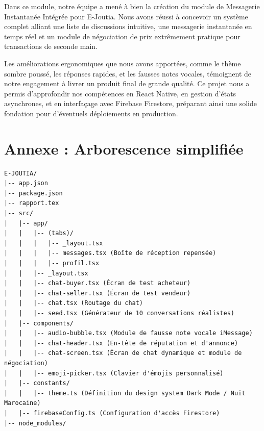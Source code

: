 \documentclass[12pt,a4paper]{report}
\begin{document}
Dans ce module, notre équipe a mené à bien la création du module de Messagerie Instantanée Intégrée pour E-Joutia. Nous avons réussi à concevoir un système complet alliant une liste de discussions intuitive, une messagerie instantanée en temps réel et un module de négociation de prix extrêmement pratique pour transactions de seconde main.

Les améliorations ergonomiques que nous avons apportées, comme le thème sombre poussé, les réponses rapides, et les fausses notes vocales, témoignent de notre engagement à livrer un produit final de grande qualité. Ce projet nous a permis d'approfondir nos compétences en React Native, en gestion d'états asynchrones, et en interfaçage avec Firebase Firestore, préparant ainsi une solide fondation pour d'éventuels déploiements en production.

\newpage
\chapter*{Annexe : Arborescence simplifiée}

\begin{verbatim}
E-JOUTIA/
|-- app.json
|-- package.json
|-- rapport.tex
|-- src/
|   |-- app/
|   |   |-- (tabs)/
|   |   |   |-- _layout.tsx
|   |   |   |-- messages.tsx (Boîte de réception repensée)
|   |   |   |-- profil.tsx
|   |   |-- _layout.tsx
|   |   |-- chat-buyer.tsx (Écran de test acheteur)
|   |   |-- chat-seller.tsx (Écran de test vendeur)
|   |   |-- chat.tsx (Routage du chat)
|   |   |-- seed.tsx (Générateur de 10 conversations réalistes)
|   |-- components/
|   |   |-- audio-bubble.tsx (Module de fausse note vocale iMessage)
|   |   |-- chat-header.tsx (En-tête de réputation et d'annonce)
|   |   |-- chat-screen.tsx (Écran de chat dynamique et module de négociation)
|   |   |-- emoji-picker.tsx (Clavier d'émojis personnalisé)
|   |-- constants/
|   |   |-- theme.ts (Définition du design system Dark Mode / Nuit Marocaine)
|   |-- firebaseConfig.ts (Configuration d'accès Firestore)
|-- node_modules/
\end{verbatim}
\end{document}
